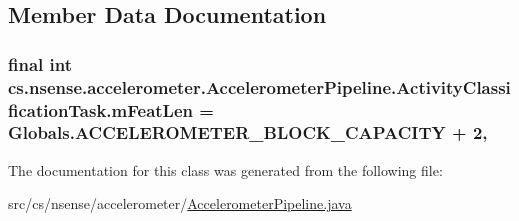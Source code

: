 \subsection{Member Data Documentation}
\hypertarget{classcs_1_1nsense_1_1accelerometer_1_1_accelerometer_pipeline_1_1_activity_classification_task_ac309ffec369213bef1defe632051366d}{
\subsubsection[{m\-Feat\-Len}]{\setlength{\rightskip}{0pt plus 5cm}final int cs.\-nsense.\-accelerometer.\-Accelerometer\-Pipeline.\-Activity\-Classification\-Task.\-m\-Feat\-Len = {\bf Globals.\-A\-C\-C\-E\-L\-E\-R\-O\-M\-E\-T\-E\-R\-\_\-\-B\-L\-O\-C\-K\-\_\-\-C\-A\-P\-A\-C\-I\-T\-Y} + 2\hspace{0.3cm}{\ttfamily [static]}, {\ttfamily [private]}}}\label{classcs_1_1nsense_1_1accelerometer_1_1_accelerometer_pipeline_1_1_activity_classification_task_ac309ffec369213bef1defe632051366d}


The documentation for this class was generated from the following file\-:\begin{DoxyCompactItemize}
\item 
src/cs/nsense/accelerometer/\hyperlink{_accelerometer_pipeline_8java}{Accelerometer\-Pipeline.\-java}\end{DoxyCompactItemize}
